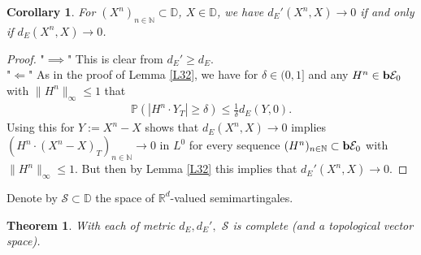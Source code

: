 \documentclass[12pt,a4paper, twoside]{article}
\newtheorem{thm}{Theorem}[section]
\newtheorem{cor}{Corollary}[section]
\theoremstyle{definition}
\newcommand{\PP}{\mathbb{P}} %
\newcommand{\simple}{\textbf{\text{b}}\mathcal{E}}
\begin{document}
\begin{cor} \label{C33} For $(X^n)_{n \in \mathbb{N}} \subset \mathbb{D}$, $X \in \mathbb{D}$, we have $d_E'(X^n,X) \to 0$ if and only if $d_E(X^n,X) \to 0$.
\end{cor}
\begin{proof}
"$\implies$" This is clear from $d_E' \geq d_E$. 
\\
"$\Longleftarrow$" As in the proof of Lemma \ref{L32}, we have for $\delta \in (0,1]$ and any $H^n \in \simple_0$ with $\|H^n\|_\infty \leq 1$ that 
\begin{align*}
\PP(|H^n \cdot Y_T| \geq \delta) \leq \frac{1}{\delta} d_E(Y,0).
\end{align*}
Using this for $Y:= X^n-X$ shows that $d_E(X^n,X) \to 0$ implies $(H^n \cdot (X^n-X)_T)_{n \in \mathbb{N}} \to 0$ in $L^0$ for every sequence $(H^n)_{n \in \mathbb{N}} \subset \simple_0$ with $\|H^n\|_\infty \leq 1$. But then by Lemma \ref{L32} this implies that $d_E'(X^n,X) \to 0$. 
\end{proof}
\newpage
Denote by $\mathcal{S} \subset \mathbb{D}$ the space of $\mathbb{R}^d$-valued semimartingales. 
\begin{thm}\label{T34} With each of metric $d_E, d_E',$ $\mathcal{S}$ is complete (and a topological vector space).
\end{thm}
\end{document}
